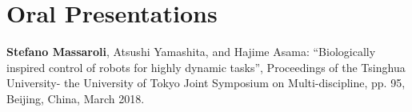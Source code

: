 \section*{Oral Presentations}
\begin{enumerate}[{[}1{]}]
	\item \textbf{Stefano Massaroli}, Atsushi Yamashita, and Hajime Asama: ``Biologically inspired control of robots for highly dynamic tasks'', Proceedings of the Tsinghua University- the University of Tokyo
	Joint Symposium on Multi-discipline, pp. 95, Beijing, China, March 2018.
\end{enumerate}